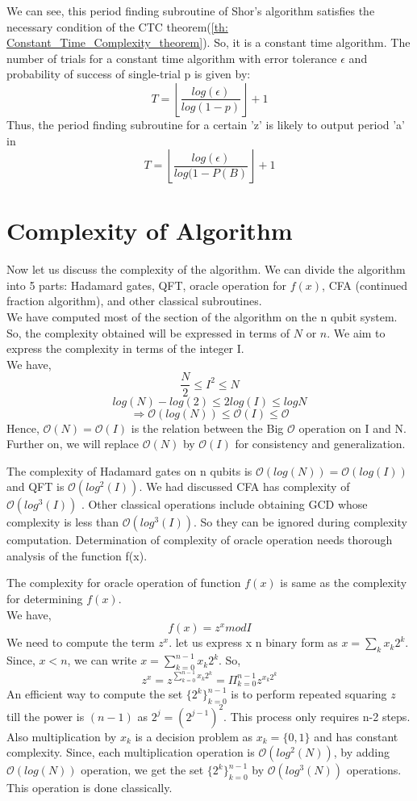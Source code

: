 We can see, this period finding subroutine of Shor's algorithm satisfies the necessary condition of the CTC theorem(\ref{th: Constant_Time_Complexity_theorem}). So, it is a constant time algorithm. The number of trials for a constant time algorithm with error tolerance $\epsilon$ and probability of success of single-trial p is given by:
\begin{equation*}
    T = \left \lfloor \frac{log(\epsilon)}{log(1-p)} \right\rfloor  + 1
\end{equation*}
Thus, the period finding subroutine for a certain 'z' is likely to output period 'a' in
\begin{equation*}
    T = \left \lfloor \frac{log(\epsilon)}{log(1- P(B)} \right\rfloor  + 1
\end{equation*}
\section{Complexity of Algorithm}
Now let us discuss the complexity of the algorithm. We can divide the algorithm into 5 parts: Hadamard gates, QFT, oracle operation for $f(x)$, CFA (continued fraction algorithm), and other classical subroutines.
\\We have computed most of the section of the algorithm on the n qubit system. So, the complexity obtained will be expressed in terms of $N$ or $n$. We aim to express the complexity in terms of the integer I. 
\\ We have, $$\frac{N}{2}\leq I^2 \leq N$$
$$log(N)-log(2)\leq 2log(I) \leq log N $$ 
$$\Rightarrow \mathcal{O}(log(N)) \leq \mathcal{O}(I)\leq \mathcal{O}$$
Hence, $\mathcal{O}(N)=\mathcal{O}(I)$ is the relation between the Big $\mathcal{O}$ operation on I and N. Further on, we will replace $\mathcal{O}(N)$ by $\mathcal{O}(I)$ for consistency and generalization.


The complexity of Hadamard gates on n qubits is $\mathcal{O}(log(N)) = \mathcal{O}(log(I))$ and QFT is $\mathcal{O}(log^2(I))$. We had discussed CFA has complexity of $\mathcal{O}(log^3(I))$ . Other classical operations include obtaining GCD whose complexity is less than $\mathcal{O}(log^3(I))$. So they can be ignored during complexity computation. Determination of complexity of oracle operation needs thorough analysis of the function f(x).

The complexity for oracle operation of function $f(x)$ is same as the complexity for determining $f(x)$.
\\ We have, $$f(x)=z^x mod I$$
We need to compute the term $z^x$. let us express x n binary form as $x= \sum_k x_k 2^k$. Since, $x<n$, we can write $x= \sum_{k=0}^{n-1} x_k 2^k$. So,
$$ z^x = z^{\sum_{k=0}^{n-1} x_k 2^k} = \Pi_{k=0}^{n-1} z^{x_k 2^k}  $$
An efficient way to compute the set $ \{2^k\}_{k=0}^{n-1}$ is to perform repeated squaring $z$ till the power is $(n-1)$ as $2^j =(2^{j-1})^2$. This process only requires n-2 steps. Also multiplication by $x_k$ is a decision problem as $x_k= \{0,1\}$ and has constant complexity. Since, each multiplication operation is $\mathcal{O}(log^2(N))$, by adding $\mathcal{O}(log(N))$ operation, we get the set $ \{2^k\}_{k=0}^{n-1}$ by $\mathcal{O}(log^3(N))$ operations. This operation is done classically. 

